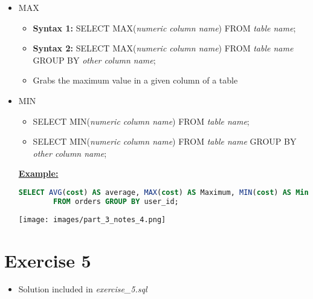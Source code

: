 \documentclass[12pt]{article}
\begin{document}
\bigskip

\begin{itemize}
    \item MAX
    \begin{itemize}
        \item \textbf{Syntax 1:} SELECT MAX(\textit{numeric column name}) FROM \textit{table name};
        \item \textbf{Syntax 2:} SELECT MAX(\textit{numeric column name}) FROM \textit{table name} GROUP BY \textit{other column name};
        \item Grabs the maximum value in a given column of a table
    \end{itemize}
    \item MIN
    \begin{itemize}
        \item SELECT MIN(\textit{numeric column name}) FROM \textit{table name};
        \item SELECT MIN(\textit{numeric column name}) FROM \textit{table name} GROUP BY \textit{other column name};
    \end{itemize}

    \bigskip

    \underline{\textbf{Example:}}

    \bigskip

    \begin{lstlisting}[language=SQL]
    SELECT AVG(cost) AS average, MAX(cost) AS Maximum, MIN(cost) AS Minimum, user_id,
        FROM orders GROUP BY user_id;
    \end{lstlisting}

    \bigskip

    \begin{center}
    \texttt{[image: images/part\_3\_notes\_4.png]}
    \end{center}
\end{itemize}

\bigskip

\section{Exercise 5}

\bigskip

\begin{itemize}
    \item Solution included in \textit{exercise\_5.sql}
\end{itemize}

\bigskip
\end{document}
